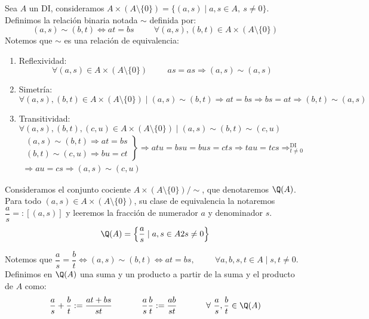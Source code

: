 Sea $A$ un DI, consideramos $A \times (A \setminus \{0\}) = \{(a,s) \mid a,s \in A,~ s \neq 0\}$.\newline
Definimos la relación binaria notada $\sim$ definida por:
$$(a,s) \sim (b,t) \Longleftrightarrow at = bs\hspace{1cm}\forall (a,s), (b,t) \in A \times (A \setminus \{0\})$$
Notemos que $\sim$ es una relación de equivalencia:
\begin{enumerate}
    \item Reflexividad:
    $$\forall (a,s) \in A \times (A \setminus \{0\})\hspace{1cm}as=as \Longrightarrow (a,s)\sim(a,s)$$

    \item Simetría:
    $$\forall (a,s), (b,t) \in A \times (A \setminus \{0\}) \mid (a,s) \sim (b,t) \Longrightarrow at = bs \Longrightarrow bs = at
    \Longrightarrow (b,t) \sim (a,s)$$

    \item Transitividad: $\forall (a,s), (b,t), (c,u) \in A \times (A \setminus \{0\}) \mid (a,s) \sim (b,t) \sim (c,u)$
    \begin{multline*}
            \left. \begin{array}{l}
            (a,s) \sim (b,t) \Longrightarrow at = bs \\
            (b,t) \sim (c,u) \Longrightarrow bu = ct
        \end{array} \right\} \Longrightarrow atu = bsu = bus = cts \Longrightarrow tau = tcs \mathop{\Longrightarrow}^{\mbox{DI}}_{t\neq0} \\
        \Longrightarrow au = cs \Longrightarrow (a,s) \sim (c,u)
    \end{multline*}
\end{enumerate}

Consideramos el conjunto cociente $A \times (A \setminus \{0\})/\sim$, que denotaremos $\Q(A)$. Para todo
$(a,s) \in A \times (A \setminus \{0\})$, su clase de equivalencia la notaremos $\dfrac{a}{s} =: [(a,s)]$ y leeremos la fracción de numerador $a$ y denominador $s$.
$$\Q(A) = \left\{\dfrac{a}{s} \mid a,s \in A \y s \neq 0 \right\}$$

\noindent
Notemos que $\dfrac{a}{s} = \dfrac{b}{t} \Longleftrightarrow (a,s) \sim (b,t) \Longleftrightarrow at = bs,\hspace{1cm}\forall a,b,s,t \in A \mid s,t \neq 0$.\\

Definimos en $\Q(A)$ una suma y un producto a partir de la suma y el producto de $A$ como:
$$\dfrac{a}{s} + \dfrac{b}{t} := \dfrac{at + bs}{st}\hspace{1cm}~~\dfrac{a}{s}\dfrac{b}{t} := \dfrac{ab}{st}\hspace{1cm}~~\forall  ~\dfrac{a}{s},
    \dfrac{b}{t} \in \Q(A)$$
    
